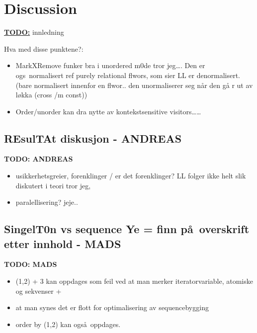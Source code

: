 \chapter{Discussion}
\label{chapter:discussion}

\textbf{\underline{\LARGE TODO:}} innledning


Hva med disse punktene?:
\begin{itemize}
	\item MarkXRemove funker bra i unordered m0de tror jeg\ldots. Den er ogs\a~normalisert ref purely relational
	flwors, som sier LL er denormalisert. (bare normalisert innenfor en flwor.. den unormaliserer seg n\aa r den g\aa
	r ut av l\o kka (cross /m const))
	\item Order/unorder kan dra nytte av kontekstsensitive visitors\ldots\ldots
\end{itemize}

\section{REsulTAt diskusjon - {{ANDREAS}}}
\label{sect:disc:res}
\textbf{\LARGE TODO: {{ANDREAS}}}
\begin{itemize}
  \item usikkerhetsgreier, forenklinger / er det forenklinger? LL folger ikke helt slik diskutert i teori tror jeg,
  \item paralellisering? jeje..
\end{itemize}

\section{SingelT0n vs sequence Ye = finn p\aa~overskrift etter innhold - {MADS}}
\label{sect:disc:singelton}
\textbf{\LARGE TODO: {MADS}}
\begin{itemize}
   \item (1,2) + 3 kan oppdages som feil ved at man merker iteratorvariable, atomiske og sekvenser + 
   \item at man synes det er flott for optimalisering av sequencebygging 
   \item order by (1,2) kan ogs\aa~oppdages. 
\end{itemize}

